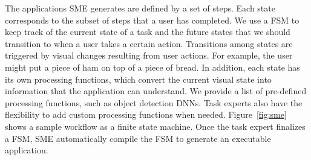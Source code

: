 The applications SME generates are defined by a set of steps. Each state
corresponds to the subset of steps that a user has completed. We use a FSM to
keep track of the current state of a task and the future states that we should
transition to when a user takes a certain action. Transitions among states are
triggered by visual changes resulting from user actions. For example, the user
might put a piece of ham on top of a piece of bread. In addition, each state has
its own processing functions, which convert the current visual state into
information that the application can understand. We provide a list of
pre-defined processing functions, such as object detection DNNs. Task experts
also have the flexibility to add custom processing functions when needed.
Figure~\ref{fig:sme} shows a sample workflow as a finite state machine. Once the
task expert finalizes a FSM, SME automatically compile the FSM to generate an
executable application.
